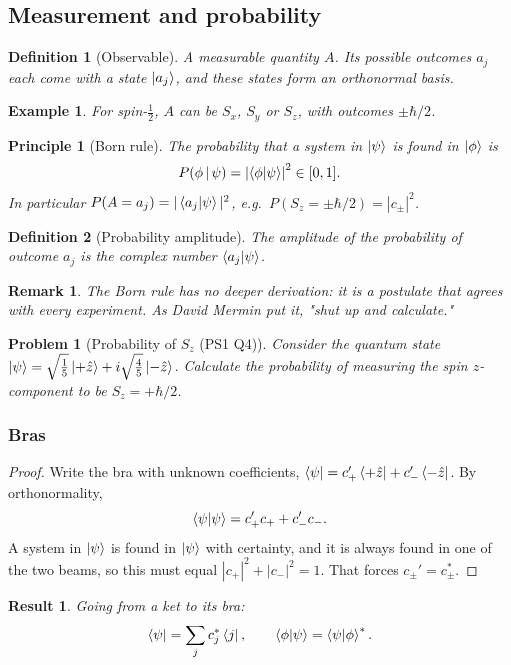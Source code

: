 \documentclass{article}
\newtheorem{principle}{Principle}
\newtheorem{definition}{Definition}
\newtheorem{problem}{Problem}
\newtheorem*{example}{Example}
\newtheorem{remark}{Remark}
\newtheorem{result}{Result}
\begin{document}
\subsection{Measurement and probability}
\begin{definition}[Observable]
    A measurable quantity $A$. Its possible outcomes $a_j$ each come with a state $\ket{a_j}$, and these states form an orthonormal basis.
\end{definition}
\begin{example}
    For spin-$\tfrac12$, $A$ can be $S_x$, $S_y$ or $S_z$, with outcomes $\pm\hbar/2$.
\end{example}
\begin{principle}[Born rule]
    The probability that a system in $\ket{\psi}$ is found in $\ket{\phi}$ is
    \begin{equation}
        P(\phi\,|\,\psi) = \left|\braket{\phi|\psi}\right|^2 \in [0,1].
    \end{equation}
    In particular $P(A = a_j) = |\braket{a_j|\psi}|^2$, e.g.\ $P(S_z = \pm\hbar/2) = |c_\pm|^2$.
\end{principle}
\begin{definition}[Probability amplitude]
    The amplitude of the probability of outcome $a_j$ is the complex number $\braket{a_j|\psi}$.
\end{definition}
\begin{remark}
    The Born rule has no deeper derivation: it is a postulate that agrees with every experiment. As David Mermin put it, "shut up and calculate."
\end{remark}
\begin{problem}[Probability of $S_z$ (PS1 Q4)]
    Consider the quantum state $\ket{\psi} = \sqrt{\tfrac{1}{5}}\ket{+\hat{z}} + i\sqrt{\tfrac{4}{5}}\ket{-\hat{z}}$. Calculate the probability of measuring the spin $z$-component to be $S_z = +\hbar/2$.
\end{problem}

\subsubsection{Bras}
\label{sec:bras}
\begin{proof}
    Write the bra with unknown coefficients, $\bra{\psi} = c_{+}'\bra{+\hat{z}} + c_{-}'\bra{-\hat{z}}$. By orthonormality,
    \[\braket{\psi|\psi} = c_{+}'c_{+} + c_{-}'c_{-}.\]
    A system in $\ket{\psi}$ is found in $\ket{\psi}$ with certainty, and it is always found in one of the two beams, so this must equal $|c_+|^2 + |c_-|^2 = 1$. That forces $c_{\pm}' = c_{\pm}^{*}$.
\end{proof}
\begin{result}
    Going from a ket to its bra:
    \begin{equation}
        \bra{\psi} = \sum_j c_j^*\bra{j}, \qquad \braket{\phi|\psi} = \braket{\psi|\phi}^{*}.
    \end{equation}
\end{result}
\end{document}
